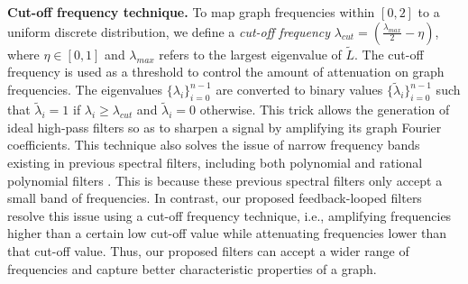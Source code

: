 \documentclass{article}
\begin{document}
\smallskip
\noindent\textbf{Cut-off frequency technique. } To map graph frequencies within $[0, 2]$ to a uniform discrete distribution, we define a \emph{cut-off frequency} $\lambda_{cut}=(\frac{\lambda_{max}}{2} - \eta)$, where $\eta\in[0,1]$ and $\lambda_{max}$ refers to the largest eigenvalue of $\tilde{L}$. The cut-off frequency is used as a threshold to control the amount of attenuation on graph frequencies. The eigenvalues $\{\lambda_i\}^{n-1}_{i=0}$ are converted to binary values $\{\tilde{\lambda}_i\}^{n-1}_{i=0}$ such that $\tilde{\lambda}_i=1$ if $\lambda_i \geq\lambda_{cut}$ and $\tilde{\lambda}_i=0$ otherwise. This trick allows the generation of ideal high-pass filters so as to sharpen a signal by amplifying its graph Fourier coefficients. This technique also solves the issue of narrow frequency bands existing in previous spectral filters, including both polynomial and rational polynomial filters \cite{defferrard2016convolutional, levie2017cayleynets}. This is because these previous spectral filters only accept a small band of frequencies. In contrast, our proposed feedback-looped filters resolve this issue using a cut-off frequency technique, i.e., amplifying frequencies higher than a certain low cut-off value while attenuating frequencies lower than that cut-off value. Thus, our proposed filters can accept a wider range of frequencies and capture better characteristic properties of a graph.

 
\end{document}
